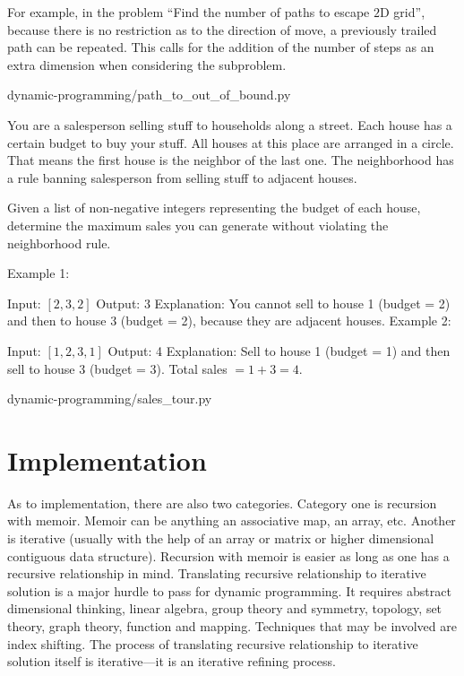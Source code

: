 \documentclass[oneside,11pt]{book}
\theoremstyle{definition}
\theoremstyle{remark}
\begin{document}
For example, in the problem ``Find the number of paths to escape $2$D grid'', because there is no
restriction as to the direction of move, a previously trailed path can be repeated.
This calls for the addition of the number of steps as an extra dimension when considering the
subproblem.

\begin{clisting}
    
    {dynamic-programming/path_to_out_of_bound.py}
\end{clisting}



You are a salesperson selling stuff to households along a street.
Each house has a certain budget to buy your stuff.
All houses at this place are arranged in a circle.
That means the first house is the neighbor of the last one.
The neighborhood has a rule banning salesperson from selling stuff to adjacent houses.

Given a list of non-negative integers representing the budget of each house, determine
the maximum sales you can generate without violating the neighborhood rule.

Example 1:

Input: $[2,3,2]$
Output: 3
Explanation: You cannot sell to house 1 (budget = 2) and then to house 3 (budget = 2),
because they are adjacent houses.
Example 2:

Input: $[1,2,3,1]$
Output: 4
Explanation: Sell to house 1 (budget = 1) and then sell to house 3 (budget = 3).
Total sales $= 1 + 3 = 4.$


\begin{clisting}
    
    {dynamic-programming/sales_tour.py}
\end{clisting}


\section{Implementation}\label{sec:dp-implementation}

As to implementation, there are also two categories.
Category one is recursion with memoir.
Memoir can be anything an associative map, an array, etc.
Another is iterative (usually with the help of an array or matrix or higher dimensional
contiguous data structure).
Recursion with memoir is easier as long as one has a recursive relationship in mind.
Translating recursive relationship to iterative solution is a major hurdle to pass for dynamic
programming.
It requires abstract dimensional thinking, linear algebra, group theory and symmetry, topology,
set theory, graph theory, function and mapping.
Techniques that may be involved are index shifting.
The process of translating recursive relationship to iterative solution itself is iterative---it
is an iterative refining process.
\end{document}
